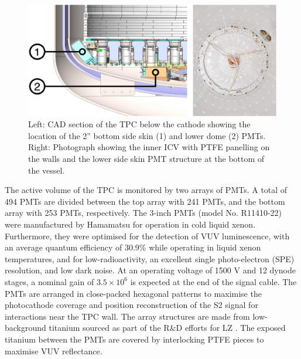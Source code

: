 {\begin{figure}[h!]
        \label{fig:tpc_diagram}
    \end{figure}
    \begin{figure}[h!]
        \centering
        \includegraphics[scale=0.77]{Chapter_2/Figures/Skin_detector.png}
        \caption[CAD diagram (left) showing the TPC below the cathode and a photograph (right), showing the PTFE panelling and the bottom skin PMT array.]%
        {Left: CAD section of the TPC below the cathode showing the location of the 2” bottom side skin (1) and lower dome (2) PMTs. Right: Photograph showing the inner ICV with PTFE panelling on the walls and the lower side skin PMT structure at the bottom of the vessel.}
        \label{fig:skin_detector_diagram}
    \end{figure}
}
%

The active volume of the TPC is monitored by two arrays of PMTs. A total of 494 PMTs are divided between the top array with 241 PMTs, and the bottom array with 253 PMTs, respectively. The 3-inch PMTs (model No. R11410-22) were manufactured by Hamamatsu for operation in cold liquid xenon. Furthermore, they were optimised for the detection of VUV luminescence, with an average quantum efficiency of 30.9\% while operating in liquid xenon temperatures, and for low-radioactivity, an excellent single photo-electron (SPE) resolution, and low dark noise. At an operating voltage of 1500 V and 12 dynode stages, a nominal gain of $3.5 \times 10^{6}$ is expected at the end of the signal cable. The PMTs are arranged in close-packed hexagonal patterns to maximise the photocathode coverage and position reconstruction of the S2 signal for interactions near the TPC wall. The array structures are made from low-background titanium sourced as part of the R\&D efforts for LZ \cite{LZ_titanium_selection}. The exposed titanium between the PMTs are covered by interlocking PTFE pieces to maximise VUV reflectance. 

